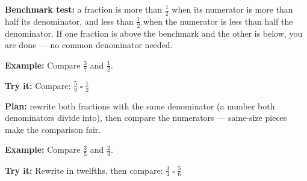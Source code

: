 \documentclass[12pt]{article}
\begin{document}


\begin{formulabox}
\textbf{Benchmark test:} a fraction is more than $\tfrac{1}{2}$ when its
numerator is more than half its denominator, and less than $\tfrac{1}{2}$
when the numerator is less than half the denominator. If one fraction is
above the benchmark and the other is below, you are done --- no common
denominator needed.
\end{formulabox}

\begin{examplebox}
\textbf{Example:} \quad Compare $\tfrac{3}{7}$ and $\tfrac{1}{2}$.
\end{examplebox}

\begin{tryitbox}
\textbf{Try it:} \quad Compare: $\tfrac{5}{9} \;\square\; \tfrac{1}{2}$\\[2pt]
\end{tryitbox}


\begin{formulabox}
\textbf{Plan:} rewrite both fractions with the same denominator (a number
both denominators divide into), then compare the numerators --- same-size
pieces make the comparison fair.
\end{formulabox}

\begin{examplebox}
\textbf{Example:} \quad Compare $\tfrac{3}{5}$ and $\tfrac{2}{3}$.
\end{examplebox}

\begin{tryitbox}
\textbf{Try it:} \quad Rewrite in twelfths, then compare:
$\tfrac{3}{4} \;\square\; \tfrac{5}{6}$\\[2pt]
\end{tryitbox}
\end{document}
